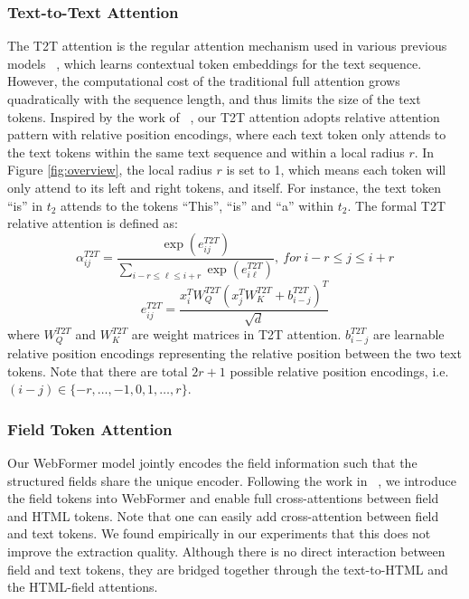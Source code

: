 \documentclass[sigconf]{acmart}
\begin{document}
\subsubsection{Text-to-Text Attention}
The T2T attention is the regular attention mechanism used in various previous models ~\cite{VaswaniSPUJGKP17,DevlinCLT19}, which learns contextual token embeddings for the text sequence.
However, the computational cost of the traditional full attention grows quadratically with the sequence length, and thus limits the size of the text tokens. Inspired by the work of ~\cite{ShawUV18,ShawMCPA19}, our T2T attention adopts relative attention pattern with relative position encodings, where each text token only attends to the text tokens within the same text sequence and within a local radius $r$. In Figure \ref{fig:overview}, the local radius $r$ is set to 1, which means each token will only attend to its left and right tokens, and itself. For instance, the text token ``is'' in $t_2$ attends to the tokens ``This'', ``is'' and ``a'' within $t_2$. The formal T2T relative attention is defined as:
\[\alpha^{T2T}_{ij} = \frac{\exp(e^{T2T}_{ij})}{\sum_{i-r\le\ell\le {i+r}} \exp(e^{T2T}_{i\ell})}, \ for \ i-r \le j \le i+r\]
%
\[e^{T2T}_{ij} = \frac{x^T_i W_Q^{T2T} (x^T_j W_K^{T2T} + b_{i-j}^{T2T})^T}{\sqrt{d}}\]
\noindent where $W_Q^{T2T}$ and $W_K^{T2T}$ are weight matrices in T2T attention. $b_{i-j}^{T2T}$ are learnable relative position encodings representing the relative position between the two text tokens. Note that there are total $2r+1$ possible relative position encodings, i.e. ${(i-j)} \in\{-r,\dots,-1,0,1,\dots,r\}$.

\subsubsection{Field Token Attention}
Our WebFormer model jointly encodes the field information such that the structured fields share the unique encoder. Following the work in ~\cite{XuWMJL19,WangYKSSSYE20}, we introduce the field tokens into WebFormer and enable full cross-attentions between field and HTML tokens. Note that one can easily add cross-attention between field and text tokens. We found empirically in our experiments that this does not improve the extraction quality. Although there is no direct interaction between field and text tokens, they are bridged together through the text-to-HTML and the HTML-field attentions.
\end{document}

